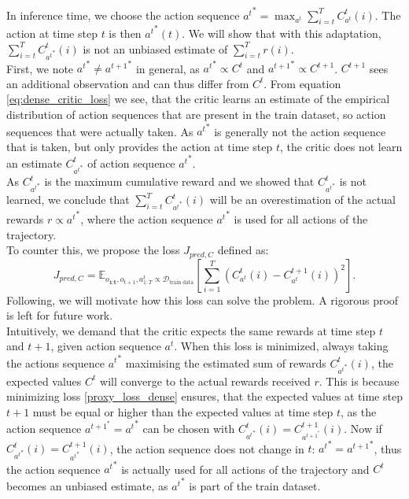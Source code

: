 In inference time, we choose the action sequence 
${a^t}^* = \max_{a^t} \sum_{i=t}^T C_{a^t}^t(i)$. The action at time step $t$ is then ${a^t}^*(t)$. We will show that with this adaptation, $\sum_{i=t}^T C_{{a^t}^*}^t(i)$ is not an unbiased estimate of 
$\sum_{i=t}^T r(i)$.\\

First, we note ${a^t}^* \neq {a^{t+1}}^*$ in general, as ${a^t}^* \propto C^t$ and ${a^{t+1}}^* \propto C^{t+1}$. $C^{t+1}$ sees an additional observation and can thus differ from $C^{t}$. 
From equation \ref{eq:dense_critic_loss} we see, that the critic learns an estimate of the empirical distribution of action sequences that are present in the train dataset, so action sequences that 
were actually taken. As ${a^t}^*$ is generally not the action sequence that is taken, but only provides the action at time step $t$, the critic does not learn an estimate $C_{{a^t}^*}^t$ of action sequence 
${a^t}^*$. \\

As $C_{{a^t}^*}^t$ is the maximum cumulative reward and we showed that $C_{{a^t}^*}^t$ is not learned, we conclude that $\sum_{i=t}^T C_{{a^t}^*}^t(i)$ 
will be an overestimation of the actual rewards $r \propto {a^t}^*$, where the action sequence ${a^t}^*$ is used for all actions of the trajectory. \\

To counter this, we propose the loss $J_{pred, C}$ defined as:
\begin{equation}
    \label{proxy_loss_dense}
    J_{pred, C} = \mathbb{E}_{o_{\textbf{1:t}} , o_{t+1}, a^t_{1:T} \propto \mathcal{D}_{\text{train data}}}\left[ \sum_{i=1}^T(C_{{a^t}}^t(i) - C_{{a^t}}^{t+1}(i))^2 \right].
\end{equation}
Following, we will motivate how this loss can solve the problem. A rigorous proof 
is left for future work.\\

Intuitively, we demand that the critic expects the same rewards at time step $t$ and $t+1$, given action sequence $a^t$. When this loss is minimized, always taking the actions sequence ${a^t}^*$ maximising the estimated sum of 
rewards $C_{{a^t}^*}^t(i)$, 
the expected values $C^t$ will converge to the actual rewards received $r$. This is because minimizing loss \ref{proxy_loss_dense} ensures, that the expected 
values at time step $t+1$ must be equal or higher than the expected values at time step $t$, as the action sequence $a^{t+1}^* = {a^t}^*$ can be chosen with 
$C_{{a^t}^*}^t(i) = C_{a^{t+1}^*}^{t+1}(i)$. Now if $C_{{a^t}^*}^t(i) = C_{{a^t}^*}^{t+1}(i)$, the action sequence does not change in $t$: ${a^t}^* = {a^{t+1}}^*$, thus the action 
sequence ${a^t}^*$ is actually used for all actions of the trajectory and $C^t$ becomes an unbiased estimate, as ${a^t}^*$ is part of the train dataset. \\

